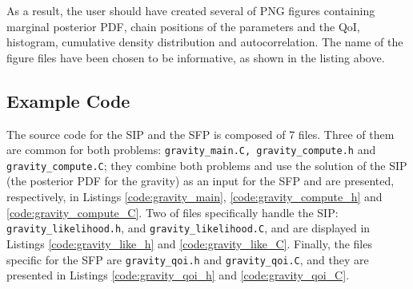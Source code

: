 As a result, the user should have created several of PNG figures containing marginal posterior PDF,
chain positions of the parameters and the QoI, histogram, cumulative density distribution and
autocorrelation. The name of the figure files have been chosen to be informative, as shown in the listing above.



\subsection{Example Code}\label{sec:gravity_code}

The source code for the SIP and the SFP is composed of 7 files.
Three of them are common for both problems: \texttt{gravity\_main.C, gravity\_compute.h} and
\texttt{gravity\_compute.C}; they combine both problems and use the solution of the SIP
(the posterior PDF for the gravity) as an input for the SFP and are presented, respectively,
in Listings \ref{code:gravity_main}, \ref{code:gravity_compute_h} and \ref{code:gravity_compute_C}.
Two of files specifically  handle the SIP: \texttt{gravity\_likelihood.h}, and \texttt{gravity\_likelihood.C},
and are displayed in Listings \ref{code:gravity_like_h} and \ref{code:gravity_like_C}. Finally, the files
specific for the SFP are \texttt{gravity\_qoi.h} and \texttt{gravity\_qoi.C}, and they are presented in
Listings \ref{code:gravity_qoi_h} and \ref{code:gravity_qoi_C}.











